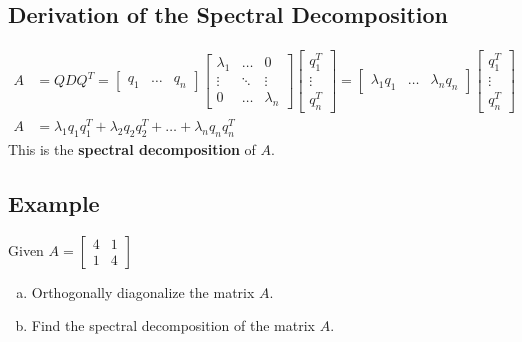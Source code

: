 \subsection*{Derivation of the Spectral Decomposition}
\begin{align*}
    A & =QDQ^T=\begin{bmatrix}
        q_1 & \dots & q_n
    \end{bmatrix}\begin{bmatrix}
        \lambda_1 & \dots  & 0         \\
        \vdots    & \ddots & \vdots    \\
        0         & \dots  & \lambda_n
    \end{bmatrix}\begin{bmatrix}
        q_1^T \\ \vdots \\ q_n^T
    \end{bmatrix} = \begin{bmatrix}
        \lambda_1 q_1 & \dots & \lambda_n q_n
    \end{bmatrix} \begin{bmatrix}
        q_1^T \\ \vdots \\ q_n^T
    \end{bmatrix} \\
    A & =\lambda_1 q_1 q_1^T+\lambda_2 q_2 q_2^T+\dots+\lambda_n q_n q_n^T
\end{align*}
This is the \textbf{spectral decomposition} of $A$.

\subsection*{Example}
Given $A=\begin{bmatrix}
        4 & 1 \\
        1 & 4
    \end{bmatrix}$
\begin{enumerate}[(a)]
    \item Orthogonally diagonalize the matrix $A$.
    \item Find the spectral decomposition of the matrix $A$.
\end{enumerate}

